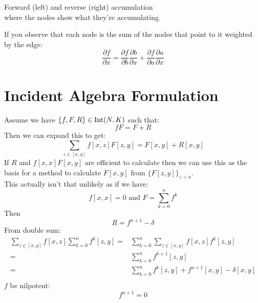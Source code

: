 \begin{center}
\quad
{}

	Forward (left) and reverse (right) accumulation\\
	where the nodes show what they're accumulating.
\end{center}
If you observe that each node is the sum of the nodes that point to it weighted by the edge:
\[\frac{\partial f}{\partial x} = \frac{\partial f}{\partial b}\frac{\partial b}{\partial x}+\frac{\partial f}{\partial a}\frac{\partial a}{\partial x}\]

\section{Incident Algebra Formulation}
Assume we have $\{f,F,R\}\in \operatorname{Int}(N,K)$ such that:
\[fF = F+R\]
Then we can expand this to get:
\[\sum_{z\in[x,y]}f[x,z]F[z,y] = F[x,y]+R[x,y]\]
If $R$ and $f[x,x]F[x,y]$ are efficient to calculate then we can use this as the basis for a method to calculate $F[x,y]$ from $\{F[z,y]\}_{z\prec x}$.
\\

This actually isn't that unlikely as if we have:
\[f[x,x] = 0 \text{ and } F = \sum_{k=0}^nf^k\]
Then
\[R=f^{n+1}-\delta\]
From double sum:
\[\begin{aligned}
	\sum_{z\in[x,y]}f[x,z]\sum_{k=0}^nf^k[z,y] =& \sum_{k=0}^n\sum_{z\in[x,y]}f[x,z]f^k[z,y]\\
	=& \sum_{k=0}^nf^{k+1}[z,y]\\
	=& \sum_{k=0}^nf^k[z,y]+f^{n+1}[x,y]-\delta[x,y]\\
\end{aligned}\]
$f$ be nilpotent:
\[f^{n+1}=0\]

